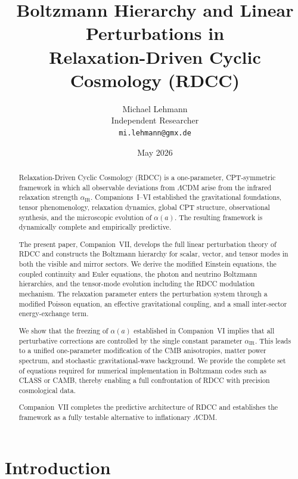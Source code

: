 \documentclass[11pt,a4paper]{article}
\title{\textbf{Boltzmann Hierarchy and Linear Perturbations in\\
Relaxation-Driven Cyclic Cosmology (RDCC)}}
\author{Michael Lehmann\\
Independent Researcher\\
\texttt{mi.lehmann@gmx.de}}
\date{May 2026}
\begin{document}
\maketitle


\begin{abstract}
Relaxation-Driven Cyclic Cosmology (RDCC) is a one-parameter, CPT-symmetric
framework in which all observable deviations from $\Lambda$CDM arise from the
infrared relaxation strength $\alpha_{\mathrm{IR}}$. Companions~I--VI established the
gravitational foundations, tensor phenomenology, relaxation dynamics, global CPT
structure, observational synthesis, and the microscopic evolution of $\alpha(a)$.
The resulting framework is dynamically complete and empirically predictive.

The present paper, Companion~VII, develops the full linear perturbation theory of
RDCC and constructs the Boltzmann hierarchy for scalar, vector, and tensor modes
in both the visible and mirror sectors. We derive the modified Einstein equations,
the coupled continuity and Euler equations, the photon and neutrino Boltzmann
hierarchies, and the tensor-mode evolution including the RDCC modulation
mechanism. The relaxation parameter enters the perturbation system through a
modified Poisson equation, an effective gravitational coupling, and a small
inter-sector energy-exchange term.

We show that the freezing of $\alpha(a)$ established in Companion~VI implies that
all perturbative corrections are controlled by the single constant parameter
$\alpha_{\mathrm{IR}}$. This leads to a unified one-parameter modification of the CMB
anisotropies, matter power spectrum, and stochastic gravitational-wave background.
We provide the complete set of equations required for numerical implementation in
Boltzmann codes such as CLASS or CAMB, thereby enabling a full confrontation of
RDCC with precision cosmological data.

Companion~VII completes the predictive architecture of RDCC and establishes the
framework as a fully testable alternative to inflationary $\Lambda$CDM.
\end{abstract}

\newpage

\tableofcontents

\newpage

\section{Introduction}
\end{document}

